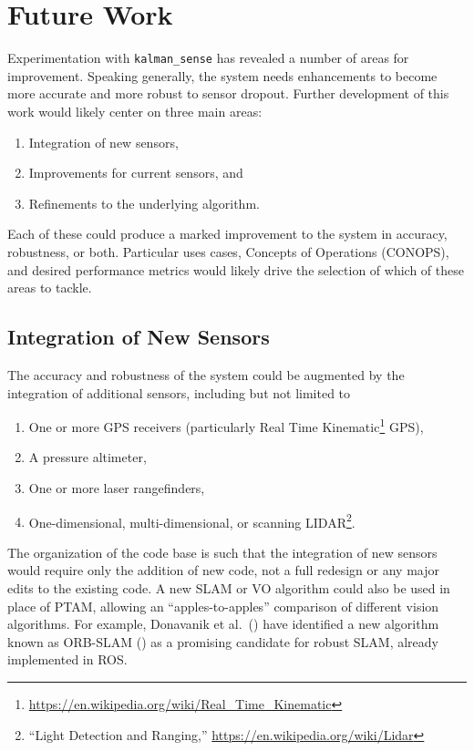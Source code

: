 \chapter{Future Work}

Experimentation with \texttt{kalman\_sense} has revealed a number of areas for improvement. Speaking generally, the system needs enhancements to become more accurate and more robust to sensor dropout. Further development of this work would likely center on three main areas:
\begin{enumerate}
\item Integration of new sensors,
\item Improvements for current sensors, and
\item Refinements to the underlying algorithm.
\end{enumerate}
Each of these could produce a marked improvement to the system in accuracy, robustness, or both. Particular uses cases, Concepts of Operations (CONOPS), and desired performance metrics would likely drive the selection of which of these areas to tackle.

\section{Integration of New Sensors}
The accuracy and robustness of the system could be augmented by the integration of additional sensors, including but not limited to
\begin{enumerate}
\item One or more GPS receivers (particularly Real Time Kinematic\footnote{\url{https://en.wikipedia.org/wiki/Real_Time_Kinematic}} GPS),
\item A pressure altimeter,
\item One or more laser rangefinders,
\item One-dimensional, multi-dimensional, or scanning LIDAR\footnote{``Light Detection and Ranging,'' \url{https://en.wikipedia.org/wiki/Lidar}}.
\end{enumerate}
The organization of the code base is such that the integration of new sensors would require only the addition of new code, not a full redesign or any major edits to the existing code. A new SLAM or VO algorithm could also be used in place of PTAM, allowing an ``apples-to-apples'' comparison of different vision algorithms. For example, Donavanik et al.\ (\cite{Donavanik2016}) have identified a new algorithm known as ORB-SLAM (\cite{Mur-Artal2015}) as a promising candidate for robust SLAM, already implemented in ROS. 

